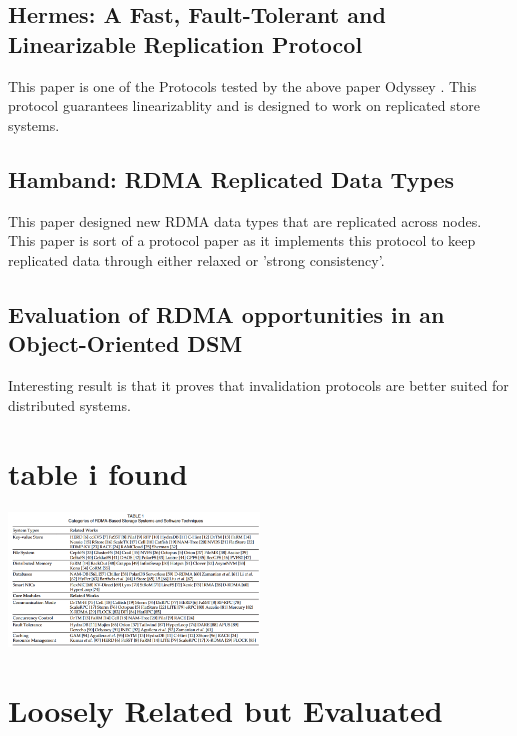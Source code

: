 \documentclass[sigplan,nonacm]{acmart}
\begin{document}
    \subsection {Hermes: A Fast, Fault-Tolerant and Linearizable Replication Protocol}
    This paper \cite{Katsarakis-ASPLOS-2020} is one of the Protocols tested by the above paper Odyssey \cite{Gavrielatos-EuroSys-2021}. This 
    protocol guarantees linearizablity and is designed to work on replicated store systems.

    \subsection {Hamband: RDMA Replicated Data Types}
    This paper \cite{Houshmand-PLDI-2022} designed new RDMA data types that are replicated across nodes. This paper 
    is sort of a protocol paper as it implements this protocol to keep replicated data through either relaxed or 'strong consistency'.

    \subsection{Evaluation of RDMA opportunities in an Object-Oriented DSM}
    Interesting result is that it proves that invalidation protocols are better suited 
    for distributed systems. \cite{Veldema-LCPC-2007}
\section{table i found}
\includegraphics[width=0.5\textwidth]{Table_1_A_Survey_of_Storage_Systems_in_the_RDMA_Era}
\cite{Ma-PDS-2022}
\section{Loosely Related but Evaluated}
\end{document}
